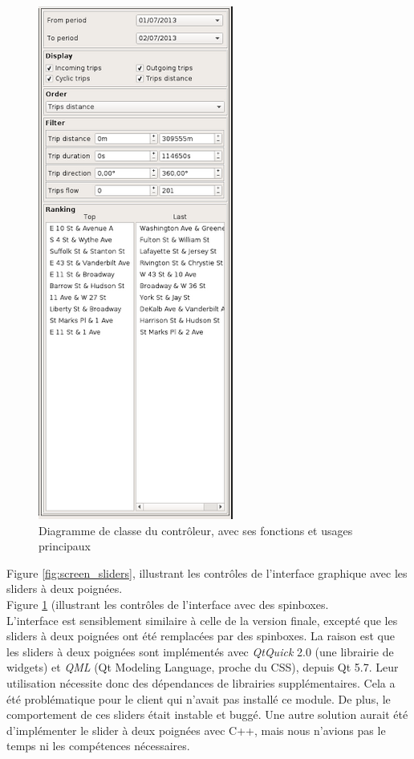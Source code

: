 \documentclass[12pt]{article}
\begin{document}
	\clearpage
		\begin{figure}[!h]
		\begin{center}
		\includegraphics[scale=.6]{interface_spinboxes.png}
		\caption{Diagramme de classe du contrôleur, avec ses fonctions et usages principaux}
		\label{fig:screen_spinbox}
		\end{center}
		\end{figure}
	
	Figure \ref{fig:screen_sliders}, illustrant les contrôles de l’interface graphique avec les sliders à deux poignées.\\
	Figure \ref{fig:screen_spinbox} (illustrant les contrôles de l’interface avec des spinboxes.\\


	L’interface est sensiblement similaire à celle de la version finale, excepté que les sliders à deux poignées ont été remplacées par des spinboxes. La raison est que les sliders à deux poignées sont implémentés avec \textit{QtQuick} 2.0 (une librairie de widgets) et \textit{QML} (Qt Modeling Language, proche du CSS), depuis Qt 5.7. Leur utilisation nécessite donc des dépendances de librairies supplémentaires. Cela a été problématique pour le client qui n’avait pas installé ce module. De plus, le comportement de ces sliders était instable et buggé. Une autre solution aurait été d'implémenter le slider à deux poignées avec C++, mais nous n’avions pas le temps ni les compétences nécessaires.	
	
\end{document}
